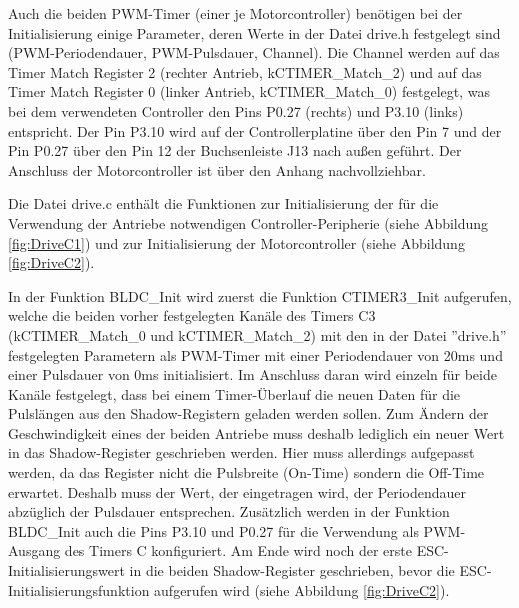 Auch die beiden \ac{PWM}-Timer (einer je Motorcontroller) benötigen bei der Initialisierung einige Parameter, deren Werte in der Datei \glqq{}drive.h\grqq{} festgelegt sind (PWM-Periodendauer, \ac{PWM}-Pulsdauer, Channel). Die Channel werden auf das Timer Match Register 2 (rechter Antrieb, \glqq{}kCTIMER\_Match\_2\grqq{}) und auf das Timer Match Register 0 (linker Antrieb, \glqq{}kCTIMER\_Match\_0\grqq{}) festgelegt, was bei dem verwendeten Controller den Pins P0.27 (rechts) und P3.10 (links) entspricht. Der Pin P3.10 wird auf der Controllerplatine über den Pin 7 und der Pin P0.27 über den Pin 12 der Buchsenleiste J13 nach außen geführt. Der Anschluss der Motorcontroller ist über den Anhang \glqq{}\grqq{} nachvollziehbar.\vspace{11pt}

Die Datei \glqq{}drive.c\grqq{} enthält die Funktionen zur Initialisierung der für die Verwendung der Antriebe notwendigen Controller-Peripherie (siehe Abbildung \ref{fig:DriveC1}) und zur Initialisierung der Motorcontroller (siehe Abbildung \ref{fig:DriveC2}).\vspace{11pt}

In der Funktion BLDC\_Init wird zuerst die Funktion CTIMER3\_Init aufgerufen, welche die beiden vorher festgelegten Kanäle des Timers C3 (\glqq{}kCTIMER\_Match\_0\grqq{} und \glqq{}kCTIMER\_Match\_2\grqq{}) mit den in der Datei ''drive.h'' festgelegten Parametern als \ac{PWM}-Timer mit einer Periodendauer von 20ms und einer Pulsdauer von 0ms initialisiert. Im Anschluss daran wird einzeln für beide Kanäle festgelegt, dass bei einem Timer-Überlauf die neuen Daten für die Pulslängen aus den Shadow-Registern geladen werden sollen. Zum Ändern der Geschwindigkeit eines der beiden Antriebe muss deshalb lediglich ein neuer Wert in das Shadow-Register geschrieben werden. Hier muss allerdings aufgepasst werden, da das Register nicht die Pulsbreite (On-Time) sondern die Off-Time erwartet. Deshalb muss der Wert, der eingetragen wird, der Periodendauer abzüglich der Pulsdauer entsprechen. Zusätzlich werden in der Funktion BLDC\_Init auch die Pins P3.10 und P0.27 für die Verwendung als \ac{PWM}-Ausgang des Timers C konfiguriert. Am Ende wird noch der erste \ac{ESC}-Initialisierungswert in die beiden Shadow-Register geschrieben, bevor die \ac{ESC}-Initialisierungsfunktion aufgerufen wird (siehe Abbildung \ref{fig:DriveC2}).

